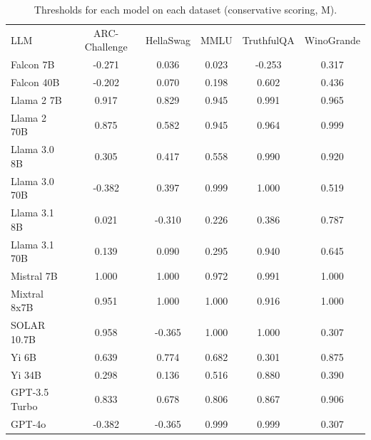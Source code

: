 \begin{table}[h]
\caption{Thresholds for each model on each dataset (conservative scoring, M). }
\label{tab:thresholds_prob_entropy_k20_w2}
\centering
\begin{tabular}{l S[table-format=3.1] S[table-format=3.1] S[table-format=3.1] S[table-format=3.1] S[table-format=3.1]}
\toprule
LLM & ARC-Challenge & HellaSwag & MMLU & TruthfulQA & WinoGrande \\ 
\cmidrule(lr){1-1} \cmidrule(lr){2-2} \cmidrule(lr){3-3} \cmidrule(lr){4-4} \cmidrule(lr){5-5} \cmidrule(lr){6-6}
Falcon 7B & -0.271 & 0.036 & 0.023 & -0.253 & 0.317\\
Falcon 40B & -0.202 & 0.070 & 0.198 & 0.602 & 0.436\\
Llama 2 7B & 0.917 & 0.829 & 0.945 & 0.991 & 0.965\\
Llama 2 70B & 0.875 & 0.582 & 0.945 & 0.964 & 0.999\\
Llama 3.0 8B & 0.305 & 0.417 & 0.558 & 0.990 & 0.920\\
Llama 3.0 70B & -0.382 & 0.397 & 0.999 & 1.000 & 0.519\\
Llama 3.1 8B & 0.021 & -0.310 & 0.226 & 0.386 & 0.787\\
Llama 3.1 70B & 0.139 & 0.090 & 0.295 & 0.940 & 0.645\\
Mistral 7B & 1.000 & 1.000 & 0.972 & 0.991 & 1.000\\
Mixtral 8x7B & 0.951 & 1.000 & 1.000 & 0.916 & 1.000\\
SOLAR 10.7B & 0.958 & -0.365 & 1.000 & 1.000 & 0.307\\
Yi 6B & 0.639 & 0.774 & 0.682 & 0.301 & 0.875\\
Yi 34B & 0.298 & 0.136 & 0.516 & 0.880 & 0.390\\
GPT-3.5 Turbo & 0.833 & 0.678 & 0.806 & 0.867 & 0.906\\
GPT-4o & -0.382 & -0.365 & 0.999 & 0.999 & 0.307\\
\bottomrule
\end{tabular}
\end{table}
